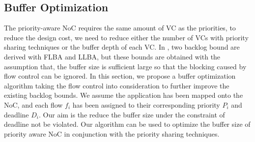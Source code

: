 \documentclass[10pt,journal]{IEEEtran}
\begin{document}
\subsection{Buffer Optimization}
The priority-aware NoC requires the same amount of VC as the priorities, to reduce the design cost, we need to reduce either the number of VCs with priority sharing techniques \cite{5161497} or the buffer depth of each VC. In \cite{189}, two backlog bound are derived with FLBA and LLBA, but these bounds are obtained with the assumption that, the buffer size is sufficient large so that the blocking caused by flow control can be ignored. In this section, we propose a buffer optimization algorithm taking the flow control into consideration to further improve the existing backlog bounds. We assume the application has been mapped onto the NoC, and each flow $f_i$ has been assigned to their corresponding priority $P_i$ and deadline $D_i$. Our aim is the reduce the buffer size under the constraint of deadline not be violated. Our algorithm can be used to optimize the buffer size of priority aware NoC in conjunction with the priority sharing techniques.
\end{document}
